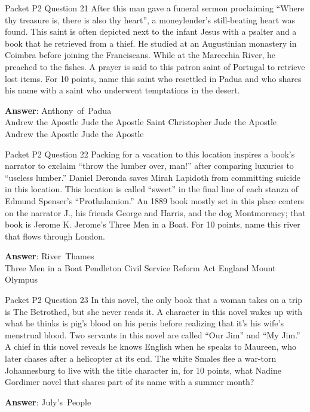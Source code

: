 \begin{frame}{Packet P2 Question 21}
After this man gave a funeral sermon proclaiming ``Where thy treasure is, there is also thy heart'', a moneylender’s still-beating heart was found. This saint is often depicted next to the infant Jesus with a psalter and a book that he retrieved from a thief. He studied at an Augustinian monastery in Coimbra before joining the Franciscans. While at the Marecchia River, he preached to the fishes. A prayer is said to this patron saint of Portugal to retrieve lost   items. For 10 points,   name this saint who resettled in Padua and who shares his name with a saint who underwent temptations in the desert.        

\textbf{Answer}: Anthony\ of\ Padua\\
 Andrew the Apostle
 Jude the Apostle
 Saint Christopher
 Jude the Apostle
 Andrew the Apostle
 Jude the Apostle
\end{frame}

\begin{frame}{Packet P2 Question 22}
Packing for a vacation to this location inspires a book’s narrator to exclaim “throw the lumber over, man!” after comparing luxuries to “useless lumber.” Daniel Deronda saves Mirah Lapidoth from committing suicide in this location. This location is called ``sweet'' in the final line of each stanza of Edmund Spenser's ``Prothalamion.'' An 1889 book mostly set in this place centers on the narrator J., his friends George and Harris, and the dog Montmorency; that book is Jerome K. Jerome’s Three Men in a Boat. For 10 points, name this river that flows through London.        

\textbf{Answer}: River\ Thames\\
 Three Men in a Boat
 Pendleton Civil Service Reform Act
 England
 Mount Olympus
\end{frame}

\begin{frame}{Packet P2 Question 23}
In this novel, the only book that a woman takes on a trip is The Betrothed, but she never reads it. A character in this novel wakes up with what he thinks is pig’s blood on his penis before realizing that   it’s his wife’s menstrual blood. Two servants in this novel are called “Our Jim” and “My Jim.” A chief in this novel reveals he knows English when he speaks to Maureen, who later   chases after a helicopter at its end. The white Smales flee a war-torn Johannesburg to live with the   title character in, for 10 points, what Nadine Gordimer novel   that shares part of its name with a summer month?

\textbf{Answer}: July's\ People\\
\end{frame}

